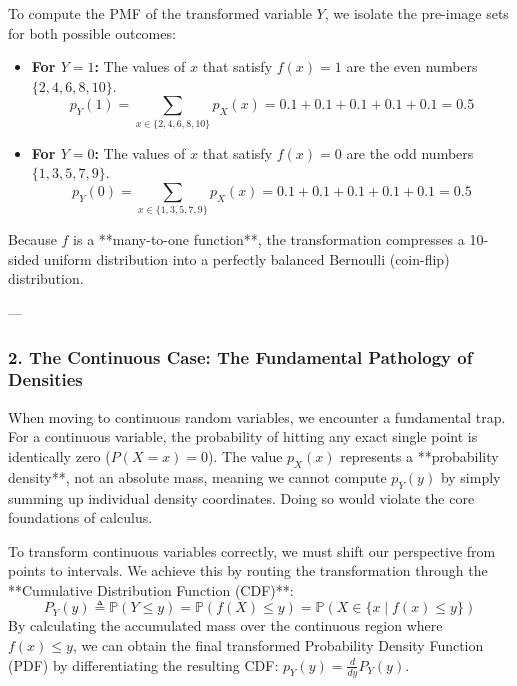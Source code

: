 \documentclass{article}
\begin{document}
To compute the PMF of the transformed variable $Y$, we isolate the pre-image sets for both possible outcomes:
\begin{itemize}
    \item \textbf{For $Y = 1$:} The values of $x$ that satisfy $f(x) = 1$ are the even numbers $\{2, 4, 6, 8, 10\}$.
    \begin{equation*}
    p_Y(1) = \sum_{x \in \{2,4,6,8,10\}} p_X(x) = 0.1 + 0.1 + 0.1 + 0.1 + 0.1 = \mathbf{0.5}
    \end{equation*}
    \item \textbf{For $Y = 0$:} The values of $x$ that satisfy $f(x) = 0$ are the odd numbers $\{1, 3, 5, 7, 9\}$.
    \begin{equation*}
    p_Y(0) = \sum_{x \in \{1,3,5,7,9\}} p_X(x) = 0.1 + 0.1 + 0.1 + 0.1 + 0.1 = \mathbf{0.5}
    \end{equation*}
\end{itemize}
Because $f$ is a **many-to-one function**, the transformation compresses a 10-sided uniform distribution into a perfectly balanced Bernoulli (coin-flip) distribution.

---

\subsubsection*{2. The Continuous Case: The Fundamental Pathology of Densities}

When moving to continuous random variables, we encounter a fundamental trap. For a continuous variable, the probability of hitting any exact single point is identically zero ($P(X = x) = 0$). The value $p_X(x)$ represents a **probability density**, not an absolute mass, meaning we cannot compute $p_Y(y)$ by simply summing up individual density coordinates. Doing so would violate the core foundations of calculus.

To transform continuous variables correctly, we must shift our perspective from points to intervals. We achieve this by routing the transformation through the **Cumulative Distribution Function (CDF)**:
\begin{equation}
P_Y(y) \triangleq \mathbb{P}(Y \le y) = \mathbb{P}(f(X) \le y) = \mathbb{P}\left(X \in \{x \mid f(x) \le y\}\right) \tag{212}
\end{equation}
By calculating the accumulated mass over the continuous region where $f(x) \le y$, we can obtain the final transformed Probability Density Function (PDF) by differentiating the resulting CDF: $p_Y(y) = \frac{d}{dy}P_Y(y)$.
\end{document}
